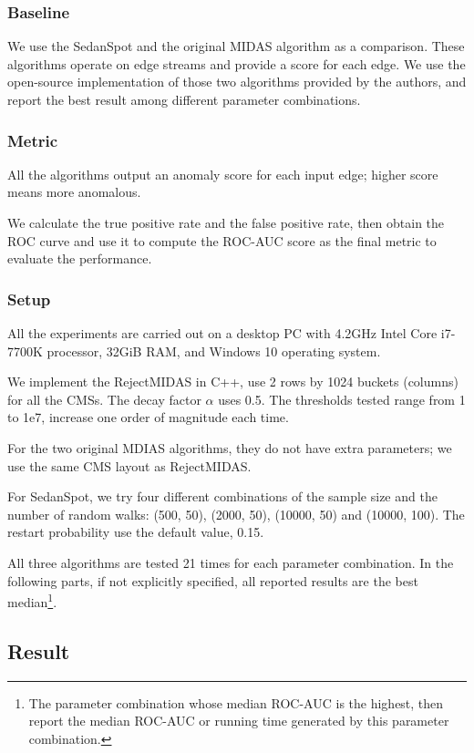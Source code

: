 \documentclass[5p]{elsarticle}
\begin{document}
	\subsubsection{Baseline}

	We use the SedanSpot and the original MIDAS algorithm as a comparison. These algorithms operate on edge streams and provide a score for each edge. We use the open-source implementation of those two algorithms provided by the authors, and report the best result among different parameter combinations.

	\subsubsection{Metric}

	All the algorithms output an anomaly score for each input edge; higher score means more anomalous.

	We calculate the true positive rate and the false positive rate, then obtain the ROC curve and use it to compute the ROC-AUC score as the final metric to evaluate the performance.

	\subsubsection{Setup}

	All the experiments are carried out on a desktop PC with 4.2GHz Intel Core i7-7700K processor, 32GiB RAM, and Windows 10 operating system.

	We implement the RejectMIDAS in C++, use 2 rows by 1024 buckets (columns) for all the CMSs. The decay factor $\alpha$ uses 0.5. The thresholds tested range from 1 to 1e7, increase one order of magnitude each time.

	For the two original MDIAS algorithms, they do not have extra parameters; we use the same CMS layout as RejectMIDAS.

	For SedanSpot, we try four different combinations of the sample size and the number of random walks: (500, 50), (2000, 50), (10000, 50) and (10000, 100). The restart probability use the default value, 0.15.

	All three algorithms are tested 21 times for each parameter combination. In the following parts, if not explicitly specified, all reported results are the best median\footnote{The parameter combination whose median ROC-AUC is the highest, then report the median ROC-AUC or running time generated by this parameter combination.}.

	\subsection{Result}
\end{document}
